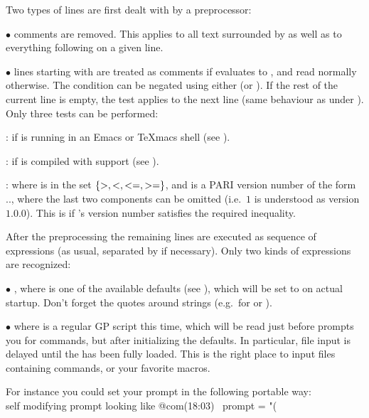Two types of lines are first dealt with by a preprocessor:

$\bullet$ comments are removed. This applies to all text surrounded by
\kbd{/*~\dots~*/} as well as to everything following \kbd{\bs\bs} on a given
line.

$\bullet$ lines starting with   are treated as
comments if  evaluates to , and read normally
otherwise. The condition can be negated using either  (or
). If the rest of the current line is empty, the test applies to
the next line (same behaviour as \kbd{=} under ). Only three tests can be
performed:

:  if  is running in an Emacs or TeXmacs shell (see
).

:  if  is compiled with  support (see
).

  : where  is in the set
$\{ {\tt >}, {\tt <}, {\tt <=}, {\tt >=} \}$, and  is a PARI
version number of the form .., where the
last two components can be omitted (i.e.~$1$ is understood as version $1.0.0$).
This is  if 's version number satisfies the required
inequality.

After the preprocessing the remaining lines are executed as
sequence of expressions (as usual, separated by \kbd{;} if necessary). Only
two kinds of expressions are recognized:

$\bullet$  \kbd{=} , where  is one of
the available defaults (see ), which will be set to
 on actual startup. Don't forget the quotes around strings
(e.g.~for  or ).

$\bullet$  where 
is a regular GP script this time, which will be read just before  prompts
you for commands, but after initializing the defaults. In particular, file
input is delayed until the  has been fully loaded. This is the
right place to input files containing  commands, or your favorite
macros.

\noindent For instance you could set your prompt in the following portable way:
\bprog
\\ self modifying prompt looking like @com\hbox{\rm(18:03) \kbd{ >}}
prompt   = "(%

